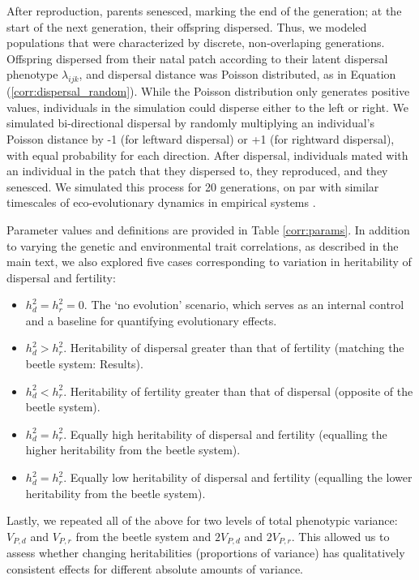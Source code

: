 \documentclass[11pt]{article}
\begin{document}
After reproduction, parents senesced, marking the end of the generation; at the start of the next generation, their offspring dispersed.
Thus, we modeled populations that were characterized by discrete, non-overlaping generations.
Offspring dispersed from their natal patch according to their latent dispersal phenotype $\lambda_{ijk}$, and dispersal distance was Poisson distributed, as in Equation (\ref{corr:dispersal_random}).
While the Poisson distribution only generates positive values, individuals in the simulation could disperse either to the left or right. We simulated bi-directional dispersal by randomly multiplying an individual's Poisson distance by -1 (for leftward dispersal) or +1 (for rightward dispersal), with equal probability for each direction.
After dispersal, individuals mated with an individual in the patch that they dispersed to, they reproduced, and they senesced.
We simulated this process for 20 generations, on par with similar timescales of eco-evolutionary dynamics in empirical systems \citep{williams_rapid_2016,ochocki_rapid_2017,weiss-lehman_rapid_2017}.

Parameter values and definitions are provided in Table \ref{corr:params}. In addition to varying the genetic and environmental trait correlations, as described in the main text, we also explored five cases corresponding to variation in heritability of dispersal and fertility:
\begin{itemize}
  \item $h^{2}_d = h^{2}_r = 0$. The `no evolution' scenario, which serves as an internal control and a baseline for quantifying evolutionary effects.
  \item $h^{2}_d > h^{2}_r$. Heritability of dispersal greater than that of fertility (matching the beetle system: Results).
  \item $h^{2}_d < h^{2}_r$. Heritability of fertility greater than that of dispersal (opposite of the beetle system).
  \item $h^{2}_d = h^{2}_r$. Equally high heritability of dispersal and fertility (equalling the higher heritability from the beetle system).
  \item $h^{2}_d = h^{2}_r$. Equally low heritability of dispersal and fertility (equalling the lower heritability from the beetle system).
\end{itemize}
Lastly, we repeated all of the above for two levels of total phenotypic variance: $V_{P,d}$ and $V_{P,r}$ from the beetle system and $2V_{P,d}$ and $2V_{P,r}$.
This allowed us to assess whether changing heritabilities (proportions of variance) has qualitatively consistent effects for different absolute amounts of variance.
\end{document}
